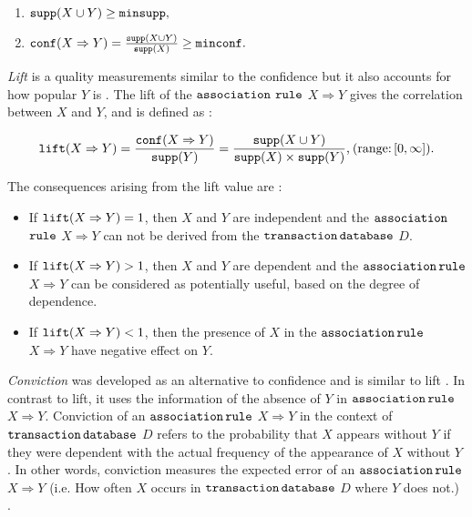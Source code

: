 				\begin{enumerate}
				\label{eqn:strong_rule}
					\item ${\operatorname{\mathtt{supp}}}(X \cup Y) \geq {\operatorname{\mathtt{minsupp}}}\text{,}$
					\item ${\operatorname{\mathtt{conf}}}(X \Rightarrow Y) = \frac{{\operatorname{\mathtt{supp}}}(X \cup Y)}{{\operatorname{\mathtt{supp}}}(X)} \geq {\operatorname{\mathtt{minconf}}}\text{.}$
				\end{enumerate}
		
		\emph{Lift} is a quality measurements similar to the confidence but it also accounts for how popular $Y$ is \cite{Hahsler2005}. The lift of the ${\operatorname{\mathtt{association}}}$ ${\operatorname{\mathtt{rule}}}$ $X \Rightarrow Y$ gives the correlation between $X$ and $Y$, and is defined as \cite{Hahsler2005}:
		
				\begin{equation}
					\label{eqn:lift}
					{\operatorname{\mathtt{lift}}}(X \Rightarrow Y) = \frac{{\operatorname{\mathtt{conf}}}(X \Rightarrow Y)}{{\operatorname{\mathtt{supp}}}(Y)} = \frac{{\operatorname{\mathtt{supp}}}(X \cup Y)}{{\operatorname{\mathtt{supp}}}(X)\times{\operatorname{\mathtt{supp}}}(Y)}\text{,}\:(\text{range:}\,[0,\infty]) \text{.}
				\end{equation}

		\vspace{2cm}
		The consequences arising from the lift value are \cite{Malik2018}:
		
			\begin{itemize}
				\item If ${\operatorname{\mathtt{lift}}}(X \Rightarrow Y) = 1$, then $X$ and $Y$ are independent and the ${\operatorname{\mathtt{association}}}$ ${\operatorname{\mathtt{rule}}}$ $X \Rightarrow Y$ can not be derived from the ${\operatorname{\mathtt{transaction}}}\,{\operatorname{\mathtt{database}}}$ $D$.
				\item If ${\operatorname{\mathtt{lift}}}(X \Rightarrow Y) > 1$, then $X$ and $Y$ are dependent and the ${\operatorname{\mathtt{association}}}\,{\operatorname{\mathtt{rule}}}$ $X \Rightarrow Y$ can be considered as potentially useful, based on the degree of dependence.
				\item If ${\operatorname{\mathtt{lift}}}(X \Rightarrow Y) < 1$, then the presence of $X$ in the ${\operatorname{\mathtt{association}}}\,{\operatorname{\mathtt{rule}}}$ $X \Rightarrow Y$ have negative effect on $Y$.
			\end{itemize}
	
		\newpage
		\emph{Conviction} was developed as an alternative to confidence and is similar to lift \cite{Hahsler2020}. In contrast to lift, it uses the information of the absence of $Y$ in ${\operatorname{\mathtt{association}}}\,{\operatorname{\mathtt{rule}}}$ $X \Rightarrow Y$. Conviction  of an ${\operatorname{\mathtt{association}}}\,{\operatorname{\mathtt{rule}}}$ $X \Rightarrow Y$ in the context of ${\operatorname{\mathtt{transaction}}}\,{\operatorname{\mathtt{database}}}$ $D$ refers to the probability that $X$ appears without $Y$ if they were dependent with the actual frequency of the appearance of $X$ without $Y$ \cite{Brin1997}\cite{Hahsler2020}. In other words, conviction measures the expected error of an ${\operatorname{\mathtt{association}}}\,{\operatorname{\mathtt{rule}}}$ $X \Rightarrow Y$ (i.e. How often $X$ occurs in ${\operatorname{\mathtt{transaction}}}\,{\operatorname{\mathtt{database}}}$ $D$ where $Y$ does not.) \cite{Zaki2014}.
		
